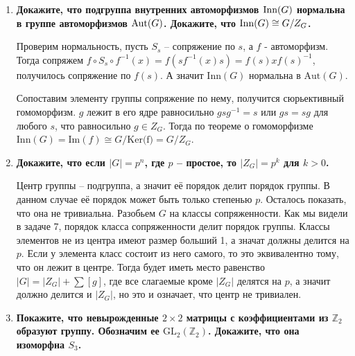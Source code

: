 \documentclass{article}
\begin{document}
\begin{enumerate}
    \item \textbf{Докажите, что подгруппа внутренних автоморфизмов $\textnormal
        {Inn}(G)$ нормальна в группе автоморфизмов $\textnormal{Aut}(G)$.
        Докажите, что $\textnormal{Inn}(G)\cong G/Z_G$.}

        Проверим нормальность, пусть $S_s$ – сопряжение по $s$, а $f$ -
        автоморфизм. Тогда сопряжем $f\circ S_s\circ f^{-1}(x)=f(sf^{-1}(x)s)=
        f(s)xf(s)^{-1}$, получилось сопряжение по $f(s)$. А значит $\text{Inn}
        (G)$ нормальна в $\text{Aut}(G)$.

        Сопоставим элементу группы сопряжение по нему, получится сюрьективный
        гомоморфизм. $g$ лежит в его ядре равносильно $gsg^{-1}=s$ или $gs=sg$
        для любого $s$, что равносильно $g\in Z_G$. Тогда по теореме о
        гомоморфизме $\text{Inn}(G)=\text{Im}(f)\cong G/\text{Ker(f)}=G/Z_G$.

    \item \textbf{Докажите, что если $|G| = p^n$, где $p$ – простое, то $|Z_G|=
        p^k$ для $k > 0$.}

        Центр группы – подгруппа, а значит её порядок делит порядок группы.
        В данном случае её порядок может быть только степенью $p$. Осталось
        показать, что она не тривиальна. Разобьем $G$ на классы сопряженности.
        Как мы видели в задаче 7, порядок класса сопряженности делит порядок
        группы. Классы элементов не из центра имеют размер больший 1, а
        значат должны делится на $p$. Если у элемента класс состоит из него
        самого, то это эквивалентно тому, что он лежит в центре. Тогда
        будет иметь место равенство $|G|=|Z_G|+\sum[g]$, где все слагаемые
        кроме $|Z_G|$ делятся на $p$, а значит должно делится и $|Z_G|$, но
        это и означает, что центр не тривиален.

    \item \textbf{Покажите, что невырожденные $2\times 2$ матрицы с
        коэффициентами из $\mathbb{Z}_2$ образуют группу. Обозначим ее
        $\text{GL}_2(\mathbb{Z}_2)$. Докажите, что она изоморфна $S_3$.}


\end{enumerate}
\end{document}
